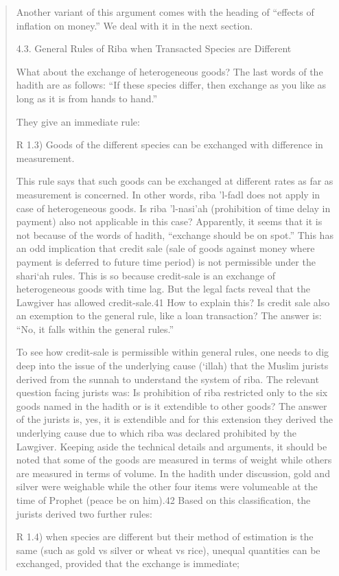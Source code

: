 \begin{quote}
Another variant of this argument comes with the heading of “effects of inflation on money.” We deal with it in the next section.

4.3. General Rules of Riba when Transacted Species are Different

What about the exchange of heterogeneous goods? The last words of the hadith are as follows: “If these species differ, then exchange as you like as long as it is from hands to hand.”

They give an immediate rule:

R 1.3) Goods of the different species can be exchanged with difference in measurement.

This rule says that such goods can be exchanged at different rates as far as measurement is concerned. In other words, riba 'l-fadl does not apply in case of heterogeneous goods. Is riba 'l-nasi'ah (prohibition of time delay in payment) also not applicable in this case? Apparently, it seems that it is not because of the words of hadith, “exchange should be on spot.” This has an odd implication that credit sale (sale of goods against money where payment is deferred to future time period) is not permissible under the shari‘ah rules. This is so because credit-sale is an exchange of heterogeneous goods with time lag. But the legal facts reveal that the Lawgiver has allowed credit-sale.41 How to explain this? Is credit sale also an exemption to the general rule, like a loan transaction? The answer is: “No, it falls within the general rules.”

To see how credit-sale is permissible within general rules, one needs to dig deep into the issue of the underlying cause (‘illah) that the Muslim jurists derived from the sunnah to understand the system of riba. The relevant question facing jurists was: Is prohibition of riba restricted only to the six goods named in the hadith or is it extendible to other goods? The answer of the jurists is, yes, it is extendible and for this extension they derived the underlying cause due to which riba was declared prohibited by the Lawgiver. Keeping aside the technical details and arguments, it should be noted that some of the goods are measured in terms of weight while others are measured in terms of volume. In the hadith under discussion, gold and silver were weighable while the other four items were volumeable at the time of Prophet (peace be on him).42 Based on this classification, the jurists derived two further rules:

R 1.4) when species are different but their method of estimation is the same (such as gold vs silver or wheat vs rice), unequal quantities can be exchanged, provided that the exchange is immediate;


\end{quote}
